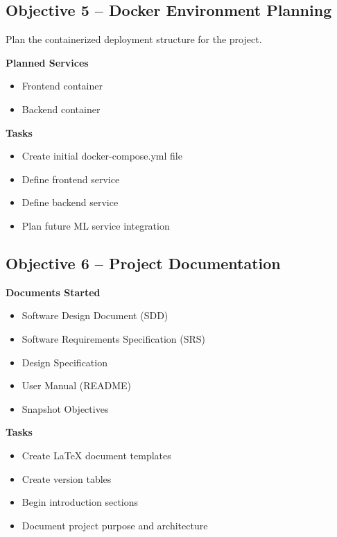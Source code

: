 \documentclass[12pt]{article}
\begin{document}
\subsection{Objective 5 -- Docker Environment Planning}

Plan the containerized deployment structure for the project.

\textbf{Planned Services}

\begin{itemize}
    \item Frontend container
    \item Backend container
\end{itemize}

\textbf{Tasks}

\begin{itemize}
    \item Create initial docker-compose.yml file
    \item Define frontend service
    \item Define backend service
    \item Plan future ML service integration
\end{itemize}

\subsection{Objective 6 -- Project Documentation}

\textbf{Documents Started}

\begin{itemize}
    \item Software Design Document (SDD)
    \item Software Requirements Specification (SRS)
    \item Design Specification
    \item User Manual (README)
    \item Snapshot Objectives
\end{itemize}

\textbf{Tasks}

\begin{itemize}
    \item Create LaTeX document templates
    \item Create version tables
    \item Begin introduction sections
    \item Document project purpose and architecture
\end{itemize}
\end{document}
